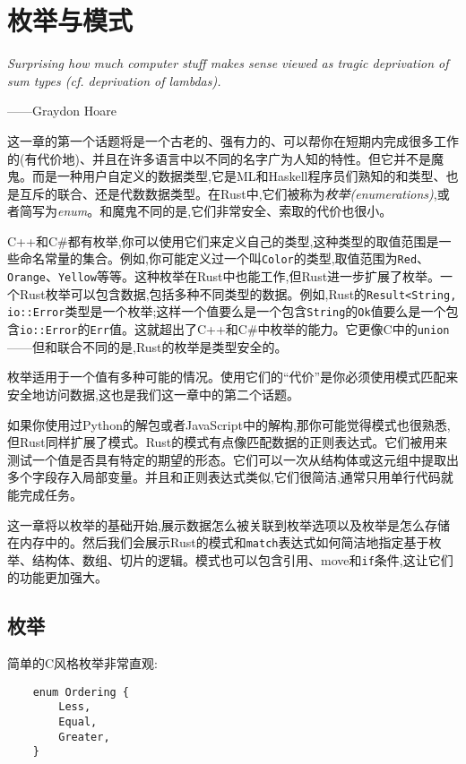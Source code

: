 \chapter{枚举与模式}\label{ch10}

\emph{Surprising how much computer stuff makes sense viewed as tragic deprivation of sum types (cf. deprivation of lambdas).}

\begin{flushright}
    ——Graydon Hoare
\end{flushright}

这一章的第一个话题将是一个古老的、强有力的、可以帮你在短期内完成很多工作的(有代价地)、并且在许多语言中以不同的名字广为人知的特性。但它并不是魔鬼。而是一种用户自定义的数据类型,它是ML和Haskell程序员们熟知的和类型、也是互斥的联合、还是代数数据类型。在Rust中,它们被称为\emph{枚举(enumerations)},或者简写为\emph{enum}。和魔鬼不同的是,它们非常安全、索取的代价也很小。

C++和C\#都有枚举,你可以使用它们来定义自己的类型,这种类型的取值范围是一些命名常量的集合。例如,你可能定义过一个叫\texttt{Color}的类型,取值范围为\texttt{Red}、\texttt{Orange}、\texttt{Yellow}等等。这种枚举在Rust中也能工作,但Rust进一步扩展了枚举。一个Rust枚举可以包含数据,包括多种不同类型的数据。例如,Rust的\texttt{Result<String, io::Error}类型是一个枚举;这样一个值要么是一个包含\texttt{String}的\texttt{Ok}值要么是一个包含\texttt{io::Error}的\texttt{Err}值。这就超出了C++和C\#中枚举的能力。它更像C中的\texttt{union}——但和联合不同的是,Rust的枚举是类型安全的。

枚举适用于一个值有多种可能的情况。使用它们的“代价”是你必须使用模式匹配来安全地访问数据,这也是我们这一章中的第二个话题。

如果你使用过Python的解包或者JavaScript中的解构,那你可能觉得模式也很熟悉,但Rust同样扩展了模式。Rust的模式有点像匹配数据的正则表达式。它们被用来测试一个值是否具有特定的期望的形态。它们可以一次从结构体或这元组中提取出多个字段存入局部变量。并且和正则表达式类似,它们很简洁,通常只用单行代码就能完成任务。

这一章将以枚举的基础开始,展示数据怎么被关联到枚举选项以及枚举是怎么存储在内存中的。然后我们会展示Rust的模式和\texttt{match}表达式如何简洁地指定基于枚举、结构体、数组、切片的逻辑。模式也可以包含引用、move和\texttt{if}条件,这让它们的功能更加强大。

\section{枚举}\label{enum}

简单的C风格枚举非常直观:
\begin{verbatim}
    enum Ordering {
        Less,
        Equal,
        Greater,
    }
\end{verbatim}

